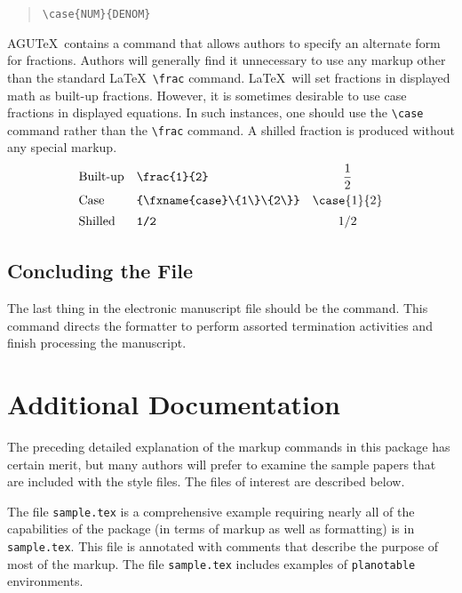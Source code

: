 \begin{quote}
\verb"\case{NUM}{DENOM}"
\end{quote}

AGU\TeX\ contains a command that allows authors to specify an 
alternate form for fractions.  Authors will generally find it 
unnecessary to use any markup other than the standard \LaTeX\ 
\verb"\frac" command.  \LaTeX\ will set fractions in displayed 
math as built-up fractions.  However, it is sometimes desirable 
to use case fractions in displayed equations.  In such instances, 
one should use the \verb"\case" command rather than the \verb"\frac"
command.  A shilled fraction is produced without any special markup.
\begin{displaymath}
\renewcommand{\arraystretch}{1.4}
\begin{array}{llc}
\mbox{Built-up} & \verb"\frac{1}{2}" & \displaystyle\frac{1}{2} \\[.5ex]
\mbox{Case} & \verb"\case{1}{2}" & \case{1}{2} \\
\mbox{Shilled} & \verb"1/2" & 1/2 \\
\end{array}
\end{displaymath}

\subsection{Concluding the File}

The last thing in the electronic manuscript file should be the
\verb"" command.  This command directs the formatter 
to perform assorted termination activities and finish processing 
the manuscript.

\section{Additional Documentation}

The preceding detailed explanation of the markup commands in this
package has certain merit, but many authors will prefer to examine
the sample papers that are included with the style files.  The 
files of interest are described below.

The file \verb"sample.tex" is a comprehensive example requiring nearly 
all of the capabilities of the package (in terms of markup as well as 
formatting) is in \verb"sample.tex".  This file is annotated with 
comments that describe the purpose of most of the markup.  The file 
\verb"sample.tex" includes examples of {\tt planotable} environments.

